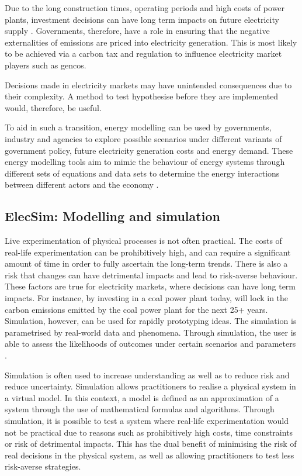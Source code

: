 Due to the long construction times, operating periods and high costs of power plants, investment decisions can have long term impacts on future electricity supply \cite{Chappin2017}. Governments, therefore, have a role in ensuring that the negative externalities of emissions are priced into electricity generation. This is most likely to be achieved via a carbon tax and regulation to influence electricity market players such as \acrfull{gencos}.


Decisions made in electricity markets may have unintended consequences due to their complexity. A method to test hypothesise before they are implemented would, therefore, be useful.

To aid in such a transition, energy modelling can be used by governments, industry and agencies to explore possible scenarios under different variants of government policy, future electricity generation costs and energy demand. These energy modelling tools aim to mimic the behaviour of energy systems through different sets of equations and data sets to determine the energy interactions between different actors and the economy \cite{Machado2019}.





\subsection{ElecSim: Modelling and simulation}




Live experimentation of physical processes is not often practical. The costs of real-life experimentation can be prohibitively high, and can require a significant amount of time in order to fully ascertain the long-term trends. There is also a risk that changes can have detrimental impacts and lead to risk-averse behaviour. These factors are true for electricity markets, where decisions can have long term impacts. For instance, by investing in a coal power plant today, will lock in the carbon emissions emitted by the coal power plant for the next 25+ years. Simulation, however, can be used for rapidly prototyping ideas. The simulation is parametrised by real-world data and phenomena. Through simulation, the user is able to assess the likelihoods of outcomes under certain scenarios and parameters \cite{Law:603360}.





Simulation is often used to increase understanding as well as to reduce risk and reduce uncertainty. Simulation allows practitioners to realise a physical system in a virtual model. In this context, a model is defined as an approximation of a system through the use of mathematical formulas and algorithms. Through simulation, it is possible to test a system where real-life experimentation would not be practical due to reasons such as prohibitively high costs, time constraints or risk of detrimental impacts. This has the dual benefit of minimising the risk of real decisions in the physical system, as well as allowing practitioners to test less risk-averse strategies.

